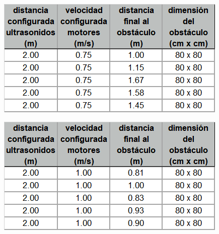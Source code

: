 \documentclass[withindex,glossary]{cam-thesis}
\begin{document}
\begin{table}[H]
  \centering
  \begin{minipage}[b]{0.4\textwidth}
  	\caption[Test Distancia Ultrasonidos - Velocidad = \SI{0.75}{\metre/\second}]{Resultados de testeo de mecanismo de control de distancia con sensor de ultrasonidos, velocidad \SI{0.75}{\metre/\second}.}
    \includegraphics[width=\textwidth]{images/Test_Ultrasonic075}    
    \label{table:ultrasonic075}
  \end{minipage}
  \hfill
  \begin{minipage}[b]{0.4\textwidth}
  	\caption[Test Distancia Ultrasonidos - Velocidad = \SI{1.00}{\metre/\second}]{Resultados de testeo de mecanismo de control de distancia con sensor de ultrasonidos, velocidad \SI{1.00}{\metre/\second}.}
    \includegraphics[width=\textwidth]{images/Test_Ultrasonic100}    
    \label{table:ultrasonic100}
  \end{minipage}
\end{table}
\end{document}
